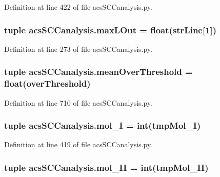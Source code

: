 Definition at line 422 of file acs\-S\-C\-Canalysis.\-py.

\hypertarget{a00097_a47da7b9153a0e4a33512f6d2675b8c1a}{
\subsubsection[{max\-L\-Out}]{\setlength{\rightskip}{0pt plus 5cm}tuple acs\-S\-C\-Canalysis.\-max\-L\-Out = float({\bf str\-Line}\mbox{[}1\mbox{]})}}\label{a00097_a47da7b9153a0e4a33512f6d2675b8c1a}


Definition at line 273 of file acs\-S\-C\-Canalysis.\-py.

\hypertarget{a00097_af10c3623be709892f4bdc4df5a3d52b0}{
\subsubsection[{mean\-Over\-Threshold}]{\setlength{\rightskip}{0pt plus 5cm}tuple acs\-S\-C\-Canalysis.\-mean\-Over\-Threshold = float({\bf over\-Threshold})}}\label{a00097_af10c3623be709892f4bdc4df5a3d52b0}


Definition at line 710 of file acs\-S\-C\-Canalysis.\-py.

\hypertarget{a00097_ae13d6607ffa236891a9af05bfa88cfcc}{
\subsubsection[{mol\-\_\-\-I}]{\setlength{\rightskip}{0pt plus 5cm}tuple acs\-S\-C\-Canalysis.\-mol\-\_\-\-I = int(tmp\-Mol\-\_\-\-I)}}\label{a00097_ae13d6607ffa236891a9af05bfa88cfcc}


Definition at line 419 of file acs\-S\-C\-Canalysis.\-py.

\hypertarget{a00097_a8f2878f5909e4aeb9155a1103eaba413}{
\subsubsection[{mol\-\_\-\-I\-I}]{\setlength{\rightskip}{0pt plus 5cm}tuple acs\-S\-C\-Canalysis.\-mol\-\_\-\-I\-I = int(tmp\-Mol\-\_\-\-I\-I)}}\label{a00097_a8f2878f5909e4aeb9155a1103eaba413}


